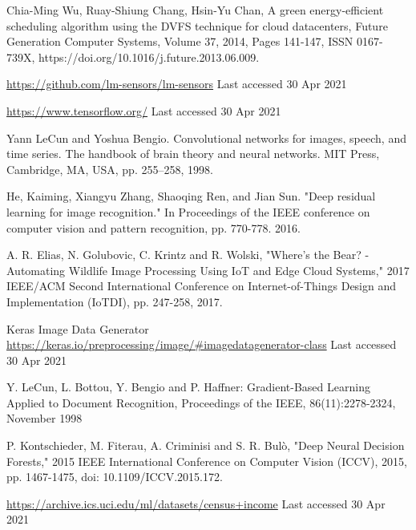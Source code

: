 \documentclass[runningheads]{llncs}
\begin{document}
\begin{thebibliography}{8}


Chia-Ming Wu, Ruay-Shiung Chang, Hsin-Yu Chan,
A green energy-efficient scheduling algorithm using the DVFS technique for cloud datacenters,
Future Generation Computer Systems,
Volume 37,
2014,
Pages 141-147,
ISSN 0167-739X,
https://doi.org/10.1016/j.future.2013.06.009.

\url{https://github.com/lm-sensors/lm-sensors} Last accessed 30 Apr 2021 

\url{https://www.tensorflow.org/} Last accessed 30 Apr 2021 


Yann LeCun and Yoshua Bengio. Convolutional networks for images, speech, and time series. The handbook of brain theory and neural networks. MIT Press, Cambridge, MA, USA, pp. 255–258, 1998.

He, Kaiming, Xiangyu Zhang, Shaoqing Ren, and Jian Sun. "Deep residual learning for image recognition." In Proceedings of the IEEE conference on computer vision and pattern recognition, pp. 770-778. 2016.

A. R. Elias, N. Golubovic, C. Krintz and R. Wolski, "Where's the Bear? - Automating Wildlife Image Processing Using IoT and Edge Cloud Systems," 2017 IEEE/ACM Second International Conference on Internet-of-Things Design and Implementation (IoTDI), pp. 247-258, 2017.

Keras Image Data Generator \url{https://keras.io/preprocessing/image/\#imagedatagenerator-class} Last accessed 30 Apr 2021



Y. LeCun, L. Bottou, Y. Bengio and P. Haffner: Gradient-Based Learning Applied to Document Recognition, Proceedings of the IEEE, 86(11):2278-2324, November 1998

P. Kontschieder, M. Fiterau, A. Criminisi and S. R. Bulò, "Deep Neural Decision Forests," 2015 IEEE International Conference on Computer Vision (ICCV), 2015, pp. 1467-1475, doi: 10.1109/ICCV.2015.172.

\url{https://archive.ics.uci.edu/ml/datasets/census+income} Last accessed 30 Apr 2021


\end{thebibliography}
\end{document}
